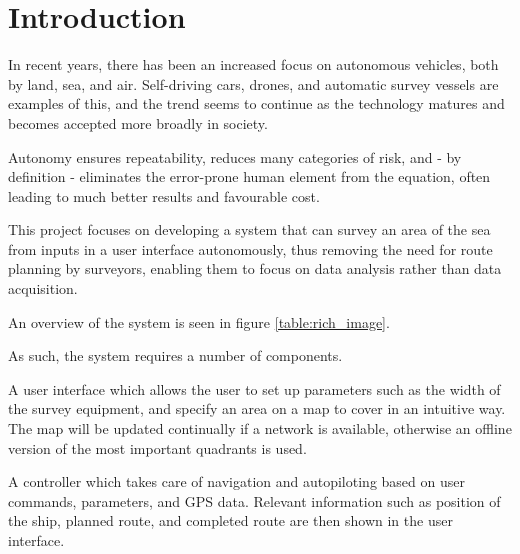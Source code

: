 \newpage
\chapter{Introduction}
In recent years, there has been an increased focus on autonomous vehicles, both by land, sea, and air. Self-driving cars, drones, and automatic survey vessels are examples of this, and the trend seems to continue as the technology matures and becomes accepted more broadly in society.

Autonomy ensures repeatability, reduces many categories of risk, and - by definition - eliminates the error-prone human element from the equation, often leading to much better results and favourable cost. 

This project focuses on developing a system that can survey an area of the sea from inputs in a user interface autonomously, thus removing the need for route planning by surveyors, enabling them to focus on data analysis rather than data acquisition. 

An overview of the system is seen in figure \ref{table:rich_image}.

As such, the system requires a number of components. 

A user interface which allows the user to set up parameters such as the width of the survey equipment, and specify an area on a map to cover in an intuitive way. The map will be updated continually if a network is available, otherwise an offline version of the most important quadrants is used.

A controller which takes care of navigation and autopiloting based on user commands, parameters, and GPS data. Relevant information such as position of the ship, planned route, and completed route are then shown in the user interface.

